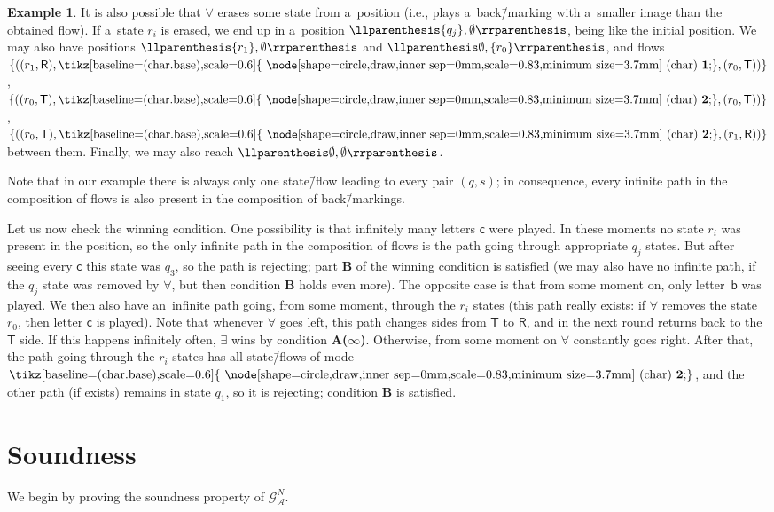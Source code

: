 \documentclass[11pt,a4paper]{amsart}
\theoremstyle{plain}
\theoremstyle{definition}
\newtheorem{exa}[thm]{Example}
\theoremstyle{defC}
\theoremstyle{thmC}
\theoremstyle{plain}
\numberwithin{equation}{section}
\numberwithin{equation}{section}
\numberwithin{figure}{section}
\newcommand{\mathcalsym}[1]{\ensuremath{\mathcal{#1}}\xspace}
\newcommand{\CA}{\mathcalsym{A}}
\newcommand{\CG}{\mathcalsym{G}}
\newcommand{\sT}{\mathsf{T}}
\newcommand{\sR}{\mathsf{R}}
\newcommand{\eve}{\ensuremath{\exists}\xspace}
\newcommand{\adam}{\ensuremath{\forall}\xspace}
\newcommand*\circled[1]{\tikz[baseline=(char.base),scale=0.6]{
            \node[shape=circle,draw,inner sep=0mm,scale=0.83,minimum size=3.7mm] (char) {\textbf{#1}};}}
\newcommand{\fb}{\mathbf{\text{\circled{2}}}}
\newcommand{\fg}{\mathbf{\text{\circled{1}}}}
\DeclarePairedDelimiter{\pair}{\llparenthesis}{\rrparenthesis}
\newcommand{\itemfont}[1]{\textbf{#1}}
\begin{document}
\begin{exa}
	It is also possible that \adam erases some state from a~position (i.e., plays a~back\=/marking with a~smaller image than the obtained flow).
	If a~state $r_i$ is erased, we end up in a~position $\pair{\{q_j\},\emptyset}$, being like the initial position.
	We may also have positions $\pair{\{r_1\},\emptyset}$ and $\pair{\emptyset,\{r_0\}}$,
	and flows $\{((r_1,\sR),\fg,(r_0,\sT))\}$, $\{((r_0,\sT),\fb,(r_0,\sT))\}$, $\{((r_0,\sT),\fb,(r_1,\sR))\}$ between them.
	Finally, we may also reach $\pair{\emptyset,\emptyset}$.
	
	Note that in our example there is always only one state\=/flow leading to every pair $(q,s)$;
	in consequence, every infinite path in the composition of flows is also present in the composition of back\=/markings.
	
	Let us now check the winning condition.
	One possibility is that infinitely many letters $\mathsf{c}$ were played.
	In these moments no state $r_i$ was present in the position, so the only infinite path in the composition of flows is the path going through appropriate $q_j$ states.
	But after seeing every $\mathsf{c}$ this state was $q_3$, so the path is rejecting; part \itemfont{B} of the winning condition is satisfied
	(we may also have no infinite path, if the $q_j$ state was removed by \adam, but then condition \itemfont{B} holds even more).
	The opposite case is that from some moment on, only letter~$\mathsf{b}$ was played.
	We then also have an~infinite path going, from some moment, through the $r_i$ states (this path really exists: if \adam removes the state $r_0$, then letter $\mathsf{c}$ is played).
	Note that whenever \adam goes left, this path changes sides from $\sT$ to $\sR$, and in the next round returns back to the $\sT$ side.
	If this happens infinitely often, \eve wins by condition \itemfont{A($\infty$)}.
	Otherwise, from some moment on \adam constantly goes right.
	After that, the path going through the $r_i$ states has all state\=/flows of mode $\fb$,
	and the other path (if exists) remains in state $q_1$, so it is rejecting;
	condition \itemfont{B} is satisfied.
\end{exa}



\section{Soundness}
\label{sec:soundness}

We begin by proving the soundness property of $\CG^N_\CA$.
\end{document}
